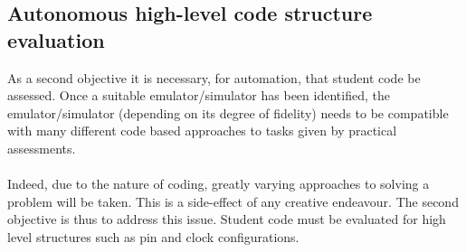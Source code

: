 \subsection{Autonomous high-level code structure evaluation}
\label{highLevObj}
As a second objective it is necessary, for automation, that student code be assessed. Once a suitable emulator/simulator has been identified, the emulator/simulator (depending on its degree of fidelity) needs to be compatible with many different code based approaches to tasks given by practical assessments.
\\\\
Indeed, due to the nature of coding, greatly varying approaches to solving a problem will be taken. This is a side-effect of any creative endeavour. The second objective is thus to address this issue. Student code must be evaluated for high level structures such as pin and clock configurations.


